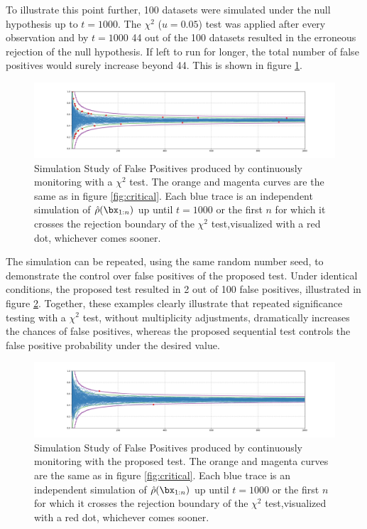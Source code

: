 \documentclass[11pt]{article}
\begin{document}
  To illustrate this point further, 100 datasets were simulated under the null hypothesis up to $t=1000$.
The $\chi^2$ ($u=0.05$) test was applied after every observation and by $t=1000$ 44 out of the 100 datasets resulted in the erroneous rejection of the null hypothesis.
If left to run for longer, the total number of false positives would surely increase beyond 44.
This is shown in figure \ref{fig:chi_fp}.
  \begin{figure}[h!]
  \centering
  \includegraphics[scale=0.35]{images/chi_fp.png}
  \caption{Simulation Study of False Positives produced by continuously monitoring with a $\chi^2$ test.
The orange and magenta curves are the same as in figure \ref{fig:critical}.
Each blue trace is an independent simulation of $\hat{\rho}(\bx_{1:n})$ up until $t=1000$ or the first $n$ for which it crosses the rejection boundary of the $\chi^2$ test,visualized with a red dot, whichever comes sooner.
}
    \label{fig:chi_fp}
  \end{figure}
  The simulation can be repeated, using the same random number seed, to demonstrate the control over false positives of the proposed test.
Under identical conditions, the proposed test resulted in 2 out of 100 false positives, illustrated in figure \ref{fig:ssrm_fp}.
Together, these examples clearly illustrate that repeated significance testing with a $\chi^2$ test, without multiplicity adjustments, dramatically increases the chances
of false positives, whereas the proposed sequential test controls the false positive probability under the desired value. 
    \begin{figure}[H]
  \centering
  \includegraphics[scale=0.35]{images/ssrm_fp.png}
  \caption{Simulation Study of False Positives produced by continuously monitoring with the proposed test.
The orange and magenta curves are the same as in figure \ref{fig:critical}.
Each blue trace is an independent simulation of $\hat{\rho}(\bx_{1:n})$ up until $t=1000$ or the first $n$ for which it crosses the rejection boundary of the $\chi^2$ test,visualized with a red dot, whichever comes sooner.
}
    \label{fig:ssrm_fp}
  \end{figure}
\end{document}

